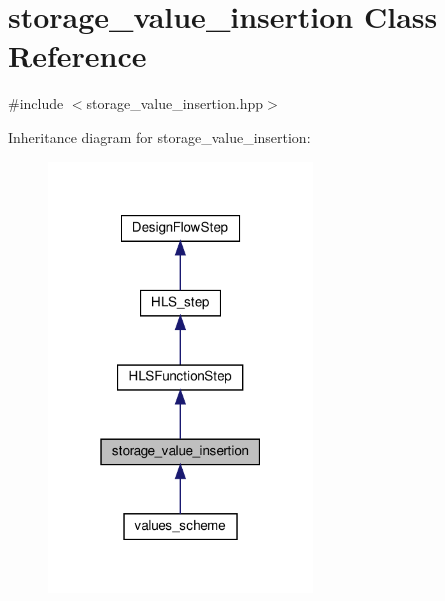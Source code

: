 \hypertarget{classstorage__value__insertion}{}\section{storage\+\_\+value\+\_\+insertion Class Reference}
\label{classstorage__value__insertion}


{\ttfamily \#include $<$storage\+\_\+value\+\_\+insertion.\+hpp$>$}



Inheritance diagram for storage\+\_\+value\+\_\+insertion\+:
\nopagebreak
\begin{figure}[H]
\begin{center}
\leavevmode
\includegraphics[width=199pt]{de/da2/classstorage__value__insertion__inherit__graph}
\end{center}
\end{figure}


